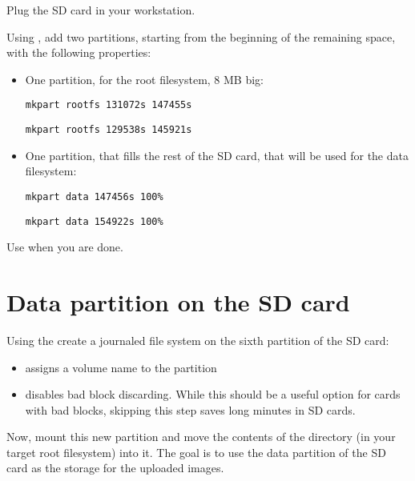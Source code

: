 Plug the SD card in your workstation.

Using , add two partitions, starting from the beginning
of the remaining space, with the following properties:
\begin{itemize}

\item One partition, for the root filesystem, 8 MB big:
\if{}
\begin{verbatim}
mkpart rootfs 131072s 147455s
\end{verbatim}
\fi
\if{}
\begin{verbatim}
mkpart rootfs 129538s 145921s
\end{verbatim}
\fi

\item One partition, that fills the rest of the SD card, that will be
  used for the data filesystem:
\if{}
\begin{verbatim}
mkpart data 147456s 100%
\end{verbatim}
\fi
\if{}
\begin{verbatim}
mkpart data 154922s 100%
\end{verbatim}
\fi
\end{itemize}

Use  when you are done.

\section{Data partition on the SD card}

Using the  create a journaled file system on the
sixth partition of the SD card:

\begin{itemize}
\item {} assigns a volume name to the partition
\item {} disables bad block discarding. While this
      should be a useful option for cards with bad blocks, skipping
      this step saves long minutes in SD cards.
\end{itemize}

Now, mount this new partition and move the contents of the
 directory (in your target root filesystem) into
it. The goal is to use the data partition of the SD card as the storage
for the uploaded images.

